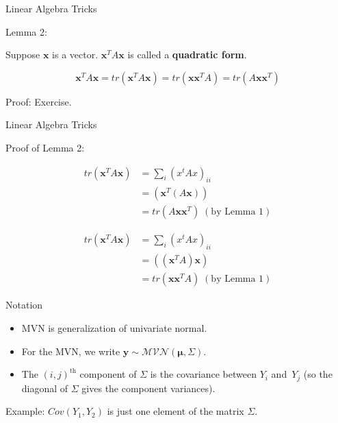 \documentclass[
  ignorenonframetext,
]{beamer}
\newcommand{\bmu}{\bm{\mu}}
\begin{document}
\begin{frame}{Linear Algebra Tricks}
\protect\hypertarget{linear-algebra-tricks-1}{}

Lemma 2:

Suppose \(\bm{x}\) is a vector. \(\bm{x}^TA\bm{x}\) is called a
\textbf{quadratic form}.

\[\bm{x}^TA\bm{x} = tr(\bm{x}^TA\bm{x}) = tr(\bm{x}\bm{x}^TA) = tr(A\bm{x}\bm{x}^T)\]

Proof: Exercise.

\end{frame}

\begin{frame}{Linear Algebra Tricks}
\protect\hypertarget{linear-algebra-tricks-2}{}

Proof of Lemma 2:

\begin{align}
tr({\bm{x}^TA\bm{x}})  
&= \sum_i (x^tAx)_{ii} \\ 
& = (\bm{x}^T(A\bm{x})) \\
& = tr(A\bm{x}\bm{x}^T) \; (\text{by Lemma 1})
\end{align}

\begin{align}
tr({\bm{x}^TA\bm{x}})  
&= \sum_i (x^tAx)_{ii} \\ 
& = ((\bm{x}^TA)\bm{x}) \\
& = tr(\bm{x}\bm{x}^TA)\; (\text{by Lemma 1})
\end{align}

\end{frame}

\begin{frame}{Notation}
\protect\hypertarget{notation}{}

\begin{itemize}
\item MVN is generalization of univariate normal.
\item For the MVN, we write $\bm{y} \sim
\mathcal{MVN}(\bmu,\Sigma)$. 
\item The $(i,j)^{\text{th}}$
component of $\Sigma$ is the covariance between $Y_i$ and~$Y_j$ (so
the diagonal of $\Sigma$ gives the component variances).
\end{itemize}

Example: \(Cov(Y_1, Y_2)\) is just one element of the matrix \(\Sigma.\)

\end{frame}
\end{document}
